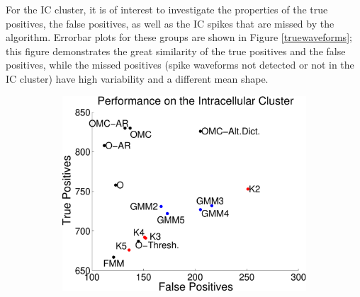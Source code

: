 For the IC cluster, it is of interest to investigate the properties of the true positives, the false positives, as well as the IC spikes that are missed by the algorithm.  Errorbar plots for these groups are shown in Figure \ref{truewaveforms}; this figure demonstrates the great similarity of the true positives and the false positives, while the missed positives (spike waveforms not detected or not in the IC cluster) have high variability and a different mean shape.
\begin{center}
\begin{figure}
\begin{subfigure}[b]{.49\textwidth}
\centering
\includegraphics[width=\textwidth]{../figs/truefalsepositive.pdf}
\caption{}
\label{hc1res}
\end{subfigure}
\begin{subfigure}[b]{.49\textwidth}

\end{subfigure}
\end{figure}
\end{center}
